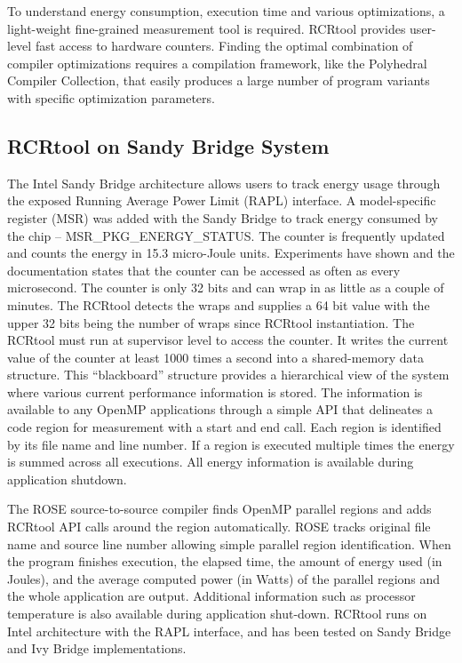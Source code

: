 To understand energy consumption, execution time and various optimizations,
a light-weight fine-grained measurement tool is required. RCRtool provides 
user-level fast access to hardware counters.
Finding the optimal combination of compiler optimizations 
requires a compilation framework, like the Polyhedral Compiler
Collection, that easily produces a large number of 
program variants with specific optimization parameters.

\subsection{RCRtool on Sandy Bridge System}
The Intel Sandy Bridge architecture allows users to track energy usage through 
the exposed Running Average Power Limit (RAPL) interface\cite{IntelSystemProgrammingVol3}. 
A model-specific register (MSR) was added with the Sandy Bridge to track energy
consumed by the chip  -- MSR\_PKG\_ENERGY\_STATUS.
The counter is frequently updated and counts the energy in 15.3 micro-Joule units.
Experiments have shown\cite{us} and the documentation\cite{IntelSystemProgrammingVol3} states
that the counter can be accessed as often as every microsecond. 
The counter is only 32 bits and can wrap in as little as a couple of minutes.
The RCRtool detects the wraps and supplies a 64 bit value with the 
upper 32 bits being the number of wraps since RCRtool instantiation.
The RCRtool must run at supervisor level to access the counter.
It writes the current value of the counter at least 1000 times a second into a shared-memory
data structure. This ``blackboard'' structure provides a hierarchical view of the system
where various current performance information is stored. The 
information is available to any OpenMP applications through a simple API that 
delineates a code region for measurement with a start and end call.
Each region is identified by its file name and line number.
If a region is executed multiple times the energy is summed across all executions. 
All energy information is available during application shutdown.

The ROSE source-to-source compiler\cite{ROSE} 
finds OpenMP parallel regions and adds RCRtool API calls around the region 
automatically. ROSE tracks original file name and source line
number allowing simple parallel region identification. When the program finishes execution,
the elapsed time, the amount of energy used (in Joules), and the average computed
power (in Watts) of the parallel regions and the whole application are output. 
Additional information such as processor temperature is also available 
during application shut-down.
RCRtool runs on Intel architecture with the RAPL interface, and has been tested
on Sandy Bridge and Ivy Bridge implementations.

